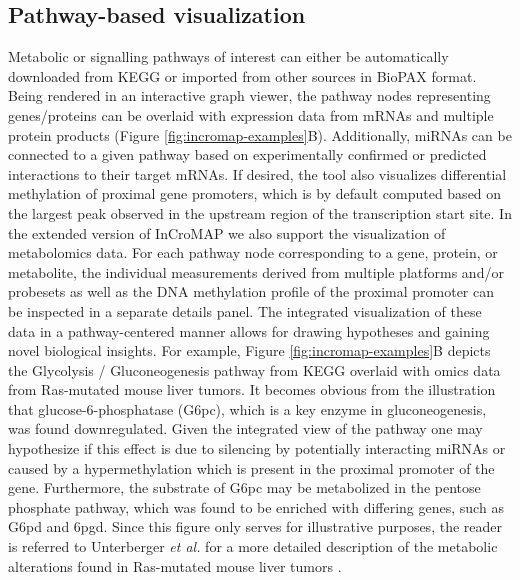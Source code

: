 \documentclass[final,5p,times,twocolumn]{elsarticle}
\newcommand\red[1]{{\color{red}#1}}
\begin{document}
\subsection{Pathway-based visualization}
Metabolic or signalling pathways of interest can either be automatically downloaded from KEGG or imported from other sources in BioPAX format. Being rendered in an interactive graph viewer, the pathway nodes representing genes/proteins can be overlaid with expression data from mRNAs and multiple protein products (Figure \ref{fig:incromap-examples}B). Additionally, miRNAs can be connected to a given pathway based on experimentally confirmed or predicted interactions to their target mRNAs. If desired, the tool also visualizes differential methylation of proximal gene promoters, which is by default computed based on the largest peak observed in the upstream region of the transcription start site. In the extended version of InCroMAP we also support the visualization of metabolomics data. For each pathway node corresponding to a gene, protein, or metabolite, the individual measurements derived from multiple platforms and/or probesets as well as the DNA methylation profile of the proximal promoter can be inspected 
in a separate details panel. \red{The integrated visualization of these data in a pathway-centered manner allows for drawing hypotheses and gaining novel biological insights. For example, Figure \ref{fig:incromap-examples}B depicts the Glycolysis / Gluconeogenesis pathway from KEGG overlaid with omics data from Ras-mutated mouse liver tumors. It becomes obvious from the illustration that glucose-6-phosphatase (G6pc), which is a key enzyme in gluconeogenesis, was found downregulated. Given the integrated view of the pathway one may hypothesize if this effect is due to silencing by potentially interacting miRNAs or caused by a hypermethylation which is present in the proximal promoter of the gene. Furthermore, the substrate of G6pc may be metabolized in the pentose phosphate pathway, which was found to be enriched with differing genes, such as G6pd and 6pgd. Since this figure only serves for illustrative purposes, the reader is referred to Unterberger \textit{et al.} for a more detailed description of the 
metabolic alterations found in Ras-mutated mouse liver tumors \cite{Unterberger2014}.}
\end{document}
